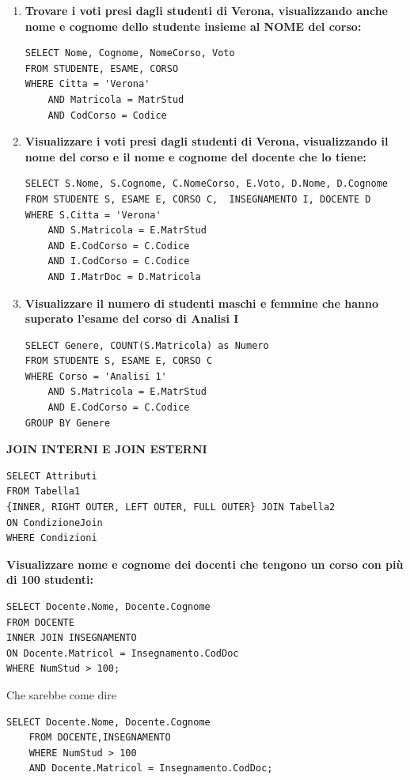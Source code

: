 \documentclass{article}
\begin{document}
\begin{enumerate}
\item \textbf{Trovare i voti presi dagli studenti di Verona, visualizzando anche nome e cognome dello studente insieme al NOME del corso:}
\begin{lstlisting}[style=sqlstyle]
SELECT Nome, Cognome, NomeCorso, Voto
FROM STUDENTE, ESAME, CORSO
WHERE Citta = 'Verona' 
	AND Matricola = MatrStud
	AND CodCorso = Codice
\end{lstlisting}

\item \textbf{Visualizzare i voti presi dagli studenti di Verona, visualizzando il nome del corso e il nome e cognome del docente che lo tiene:}
\begin{lstlisting}[style=sqlstyle]
SELECT S.Nome, S.Cognome, C.NomeCorso, E.Voto, D.Nome, D.Cognome
FROM STUDENTE S, ESAME E, CORSO C, 	INSEGNAMENTO I, DOCENTE D
WHERE S.Citta = 'Verona' 
	AND S.Matricola = E.MatrStud
	AND E.CodCorso = C.Codice
	AND I.CodCorso = C.Codice
	AND I.MatrDoc = D.Matricola
\end{lstlisting}

\item \textbf{Visualizzare il numero di studenti maschi e femmine che hanno superato l'esame del corso di Analisi I}
\begin{lstlisting}[style=sqlstyle]
SELECT Genere, COUNT(S.Matricola) as Numero
FROM STUDENTE S, ESAME E, CORSO C
WHERE Corso = 'Analisi 1'
	AND S.Matricola = E.MatrStud
	AND E.CodCorso = C.Codice
GROUP BY Genere
\end{lstlisting}
\end{enumerate}


\textbf{JOIN INTERNI E JOIN ESTERNI}
\begin{lstlisting}[style=sqlstyle]
SELECT Attributi
FROM Tabella1 
{INNER, RIGHT OUTER, LEFT OUTER, FULL OUTER} JOIN Tabella2
ON CondizioneJoin
WHERE Condizioni
\end{lstlisting}

\textbf{Visualizzare nome e cognome dei docenti che tengono un corso con più di 100 studenti:}
\begin{lstlisting}[style=sqlstyle]
SELECT Docente.Nome, Docente.Cognome
FROM DOCENTE
INNER JOIN INSEGNAMENTO
ON Docente.Matricol = Insegnamento.CodDoc
WHERE NumStud > 100;
\end{lstlisting}

Che sarebbe come dire
\begin{lstlisting}[style=sqlstyle]
	SELECT Docente.Nome, Docente.Cognome
	FROM DOCENTE,INSEGNAMENTO
	WHERE NumStud > 100
	AND Docente.Matricol = Insegnamento.CodDoc;
\end{lstlisting}
\end{document}
